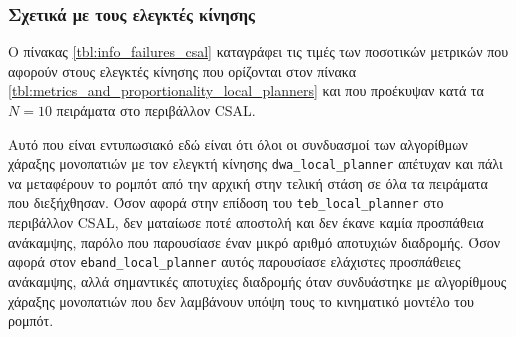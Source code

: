 \subsubsection{Σχετικά με τους ελεγκτές κίνησης}

O πίνακας \ref{tbl:info_failures_csal} καταγράφει τις τιμές των ποσοτικών
μετρικών που αφορούν στους ελεγκτές κίνησης που ορίζονται στον πίνακα
\ref{tbl:metrics_and_proportionality_local_planners} και που προέκυψαν κατά τα
$N = 10$ πειράματα στο περιβάλλον CSAL.

Αυτό που είναι εντυπωσιακό εδώ είναι ότι όλοι οι συνδυασμοί των αλγορίθμων
χάραξης μονοπατιών με τον ελεγκτή κίνησης \texttt{dwa\_local\_planner} απέτυχαν
και πάλι να μεταφέρουν το ρομπότ από την αρχική στην τελική στάση σε όλα τα
πειράματα που διεξήχθησαν. Όσον αφορά στην επίδοση του
\texttt{teb\_local\_planner} στο περιβάλλον CSAL, δεν ματαίωσε ποτέ αποστολή
και δεν έκανε καμία προσπάθεια ανάκαμψης, παρόλο που παρουσίασε έναν μικρό
αριθμό αποτυχιών διαδρομής. Όσον αφορά στον \texttt{eband\_local\_planner}
αυτός παρουσίασε ελάχιστες προσπάθειες ανάκαμψης, αλλά σημαντικές αποτυχίες
διαδρομής όταν συνδυάστηκε με αλγορίθμους χάραξης μονοπατιών που δεν λαμβάνουν
υπόψη τους το κινηματικό μοντέλο του ρομπότ.

